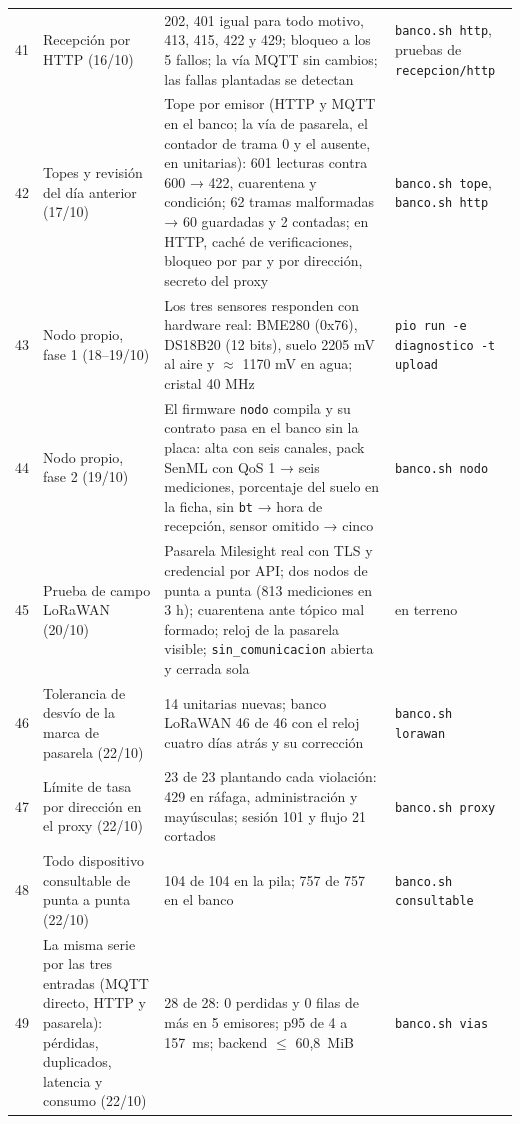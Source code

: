 \begin{longtable}{@{}L{0.8cm}L{3.2cm}L{4.2cm}L{3.8cm}@{}}
41 & Recepción por HTTP (16/10) & 202, 401 igual para todo motivo, 413, 415, 422 y 429; bloqueo a los 5 fallos; la vía MQTT sin cambios; las fallas plantadas se detectan & {\footnotesize \texttt{banco.sh http}, pruebas de \texttt{recepcion/http}} \\
42 & Topes y revisión del día anterior (17/10) & Tope por emisor (HTTP y MQTT en el banco; la vía de pasarela, el contador de trama 0 y el ausente, en unitarias): 601 lecturas contra 600 → 422, cuarentena y condición; 62 tramas malformadas → 60 guardadas y 2 contadas; en HTTP, caché de verificaciones, bloqueo por par y por dirección, secreto del proxy & {\footnotesize \texttt{banco.sh tope}, \texttt{banco.sh http}} \\
43 & Nodo propio, fase 1 (18--19/10) & Los tres sensores responden con hardware real: BME280 (0x76), DS18B20 (12 bits), suelo 2205 mV al aire y $\approx$ 1170 mV en agua; cristal 40 MHz & {\footnotesize \texttt{pio run -e diagnostico -t upload}} \\
44 & Nodo propio, fase 2 (19/10) & El firmware \texttt{nodo} compila y su contrato pasa en el banco sin la placa: alta con seis canales, pack SenML con QoS 1 → seis mediciones, porcentaje del suelo en la ficha, sin \texttt{bt} → hora de recepción, sensor omitido → cinco & {\footnotesize \texttt{banco.sh nodo}} \\
45 & Prueba de campo LoRaWAN (20/10) & Pasarela Milesight real con TLS y credencial por API; dos nodos de punta a punta (813 mediciones en 3 h); cuarentena ante tópico mal formado; reloj de la pasarela visible; \texttt{sin\_comunicacion} abierta y cerrada sola & {\footnotesize en terreno} \\
46 & Tolerancia de desvío de la marca de pasarela (22/10) & 14 unitarias nuevas; banco LoRaWAN 46 de 46 con el reloj cuatro días atrás y su corrección & \texttt{banco.sh lorawan} \\
47 & Límite de tasa por dirección en el proxy (22/10) & 23 de 23 plantando cada violación: 429 en ráfaga, administración y mayúsculas; sesión 101 y flujo 21 cortados & \texttt{banco.sh proxy} \\
48 & Todo dispositivo consultable de punta a punta (22/10) & 104 de 104 en la pila; 757 de 757 en el banco & \texttt{banco.sh consultable} \\
49 & La misma serie por las tres entradas (MQTT directo, HTTP y pasarela): pérdidas, duplicados, latencia y consumo (22/10) & 28 de 28: 0 perdidas y 0 filas de más en 5 emisores; p95 de 4 a 157~ms; backend $\leq$ 60,8~MiB & \texttt{banco.sh vias} \\

\end{longtable}
